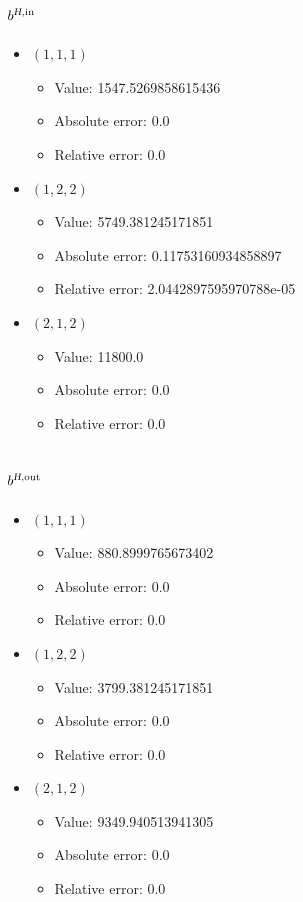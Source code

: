 \documentclass{article}%
\begin{document}
\subsection{$b^{\textsl{H},\text{in}}$}%
\begin{itemize}%
	\item $(1, 1, 1)$%
	\begin{itemize}%
		\item Value: 1547.5269858615436%
		\item Absolute error: 0.0%
		\item Relative error: 0.0%
	\end{itemize}%
	\item $(1, 2, 2)$%
	\begin{itemize}%
		\item Value: 5749.381245171851%
		\item Absolute error: 0.11753160934858897%
		\item Relative error: 2.0442897595970788e-05%
	\end{itemize}%
	\item $(2, 1, 2)$%
	\begin{itemize}%
		\item Value: 11800.0%
		\item Absolute error: 0.0%
		\item Relative error: 0.0%
	\end{itemize}%
\end{itemize}%
\subsection{$b^{\textsl{H},\text{out}}$}%
\begin{itemize}%
	\item $(1, 1, 1)$%
	\begin{itemize}%
		\item Value: 880.8999765673402%
		\item Absolute error: 0.0%
		\item Relative error: 0.0%
	\end{itemize}%
	\item $(1, 2, 2)$%
	\begin{itemize}%
		\item Value: 3799.381245171851%
		\item Absolute error: 0.0%
		\item Relative error: 0.0%
	\end{itemize}%
	\item $(2, 1, 2)$%
	\begin{itemize}%
		\item Value: 9349.940513941305%
		\item Absolute error: 0.0%
		\item Relative error: 0.0%
	\end{itemize}%
\end{itemize}%
\end{document}
